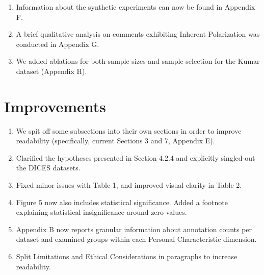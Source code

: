 \documentclass[11pt,a4paper]{article}
\begin{document}
	\begin{enumerate}
		\item Information about the synthetic experiments can now be found in Appendix F.
		\item A brief qualitative analysis on comments exhibiting Inherent Polarization was conducted in Appendix G.
		\item We added ablations for both sample-sizes and sample selection for the Kumar dataset (Appendix H).
	\end{enumerate}
	
	
	\section*{Improvements}
	
	\begin{enumerate}
		\item We spit off some subsections into their own sections in order to improve readability (specifically, current Sections 3 and 7, Appendix E).
		\item Clarified the hypotheses presented in Section 4.2.4 and explicitly singled-out the DICES datasets.
		\item Fixed minor issues with Table 1, and improved visual clarity in Table 2.
		\item Figure 5 now also includes statistical significance. Added a footnote explaining statistical insignificance around zero-values.
		\item Appendix B now reports granular information about annotation counts per dataset and examined groups within each Personal Characteristic dimension.
		\item Split Limitations and Ethical Considerations in paragraphs to increase readability.
	\end{enumerate}
	
\end{document}
